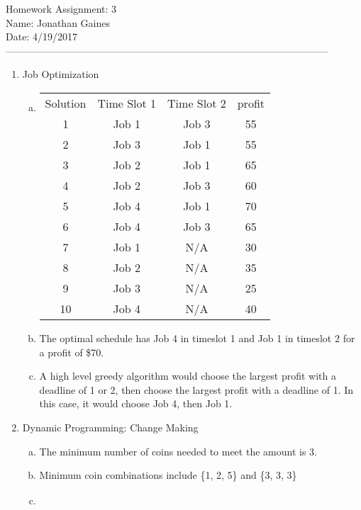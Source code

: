 \documentclass[12pt]{article}
\begin{document}
Homework Assignment: 3\\ 
Name: Jonathan Gaines\\ 
Date: 4/19/2017\\ --------------------------------------------------------------------------------------------------
\begin {enumerate}
\item Job Optimization
	\begin {enumerate}[(a)]
		\item
			\begin{tabular}{ c | c | c | c }
					 Solution & Time Slot 1 & Time Slot 2 & profit \\
									1 & Job 1 			& Job 3				& 55 \\
									2 & Job 3				& Job 1				& 55 \\
									3 & Job 2 			& Job 1				& 65 \\
									4 & Job 2 			& Job 3				& 60 \\
									5 & Job 4				& Job 1				& 70 \\
									6 & Job 4				& Job 3				& 65 \\ 
									7 & Job 1				& N/A					& 30 \\
									8 & Job 2				& N/A					& 35 \\
									9 & Job 3 			& N/A					& 25 \\
									10& Job 4				& N/A					& 40
			\end{tabular}
		\item
			The optimal schedule has Job 4 in timeslot 1 and Job 1 in timeslot 2 for a profit of \$70. \par
		\item
			A high level greedy algorithm would choose the largest profit with a deadline of 1 or 2, then choose the largest profit with a deadline of 1. In this case, it would choose Job 4, then Job 1. \par
	\end {enumerate}
\item Dynamic Programming: Change Making
	\begin {enumerate}[(a)]
		\item
			The minimum number of coins needed to meet the amount is 3. \par
		\item
			Minimum coin combinations include \{1, 2, 5\} and \{3, 3, 3\}
		\item
			\begin{tabular}{c | c | c | c | c | c | c | c | c | c | c |}

\end{tabular}
\end{enumerate}
\end{enumerate}
\end{document}
